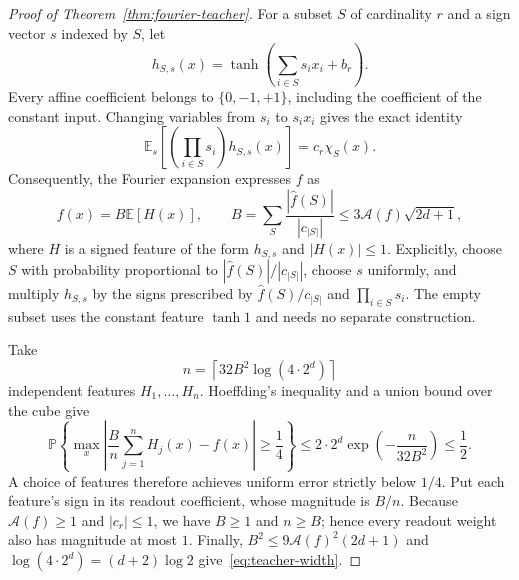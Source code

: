\begin{proof}[Proof of Theorem~\ref{thm:fourier-teacher}]
For a subset $S$ of cardinality $r$ and a sign vector $s$ indexed by $S$,
let
\[
 h_{S,s}(x)=\tanh\left(\sum_{i\in S}s_i x_i+b_r\right).
\]
Every affine coefficient belongs to $\{0,-1,+1\}$, including the
coefficient of the constant input.  Changing variables from $s_i$ to
$s_i x_i$ gives the exact identity
\begin{equation}\label{eq:parity-mixture}
 \mathbb E_s\left[
   \left(\prod_{i\in S}s_i\right)h_{S,s}(x)
 \right]=c_r\chi_S(x).
\end{equation}
Consequently, the Fourier expansion expresses $f$ as
\[
 f(x)=B\mathbb E[H(x)],
 \qquad
 B=\sum_S\frac{|\widehat f(S)|}{|c_{|S|}|}
   \le3\mathcal A(f)\sqrt{2d+1},
\]
where $H$ is a signed feature of the form $h_{S,s}$ and $|H(x)|\le1$.
Explicitly, choose $S$ with probability proportional to
$|\widehat f(S)|/|c_{|S|}|$, choose $s$ uniformly, and multiply
$h_{S,s}$ by the signs prescribed by
$\widehat f(S)/c_{|S|}$ and $\prod_{i\in S}s_i$.
The empty subset uses the constant feature $\tanh1$ and needs no separate
construction.

Take
\[
 n=\left\lceil32B^2\log(4\cdot2^d)\right\rceil
\]
independent features $H_1,\ldots,H_n$.  Hoeffding's inequality and a union
bound over the cube give
\[
 \mathbb P\left\{
  \max_x\left|\frac Bn\sum_{j=1}^nH_j(x)-f(x)\right|\ge\frac14
 \right\}
 \le2\cdot2^d\exp\left(-\frac{n}{32B^2}\right)
 \le\frac12.
\]
A choice of features therefore achieves uniform error strictly below
$1/4$.  Put each feature's sign in its readout coefficient, whose
magnitude is $B/n$.  Because $\mathcal A(f)\ge1$ and $|c_r|\le1$, we have
$B\ge1$ and $n\ge B$; hence every readout weight also has magnitude at
most $1$.  Finally,
$B^2\le9\mathcal A(f)^2(2d+1)$ and
$\log(4\cdot2^d)=(d+2)\log2$ give~\eqref{eq:teacher-width}.
\end{proof}

